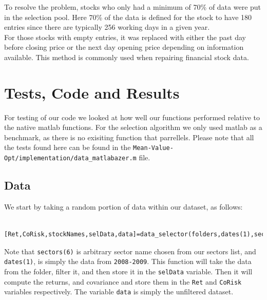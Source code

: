\documentclass[12pt,titlepage,a4paper]{article}
\begin{document}
To resolve the problem, stocks who only had a minimum of 70\% of data were put in the selection pool. Here 70\% of the data is defined for the stock to have 180 entries since there are typically 256 working days in a given year.\\

For those stocks with empty entries, it was replaced with either the past day before closing price or the next day opening price depending on information available. This method is commonly used when repairing financial stock data.  


\section{Tests, Code and Results}

\begin{par}
For testing of our code we looked at how well our functions performed relative to the native matlab functions. For the selection algorithm we only used matlab as a benchmark, as there is no exisiting function that parrellels. Please note that all the tests found here can be found in the \texttt{Mean-Value-Opt/implementation/data\_matlabazer.m} file.
\end{par} \vspace{1em}

\subsection*{Data}

\begin{par}
We start by taking a random portion of data within our dataset, as follows:
\end{par}
\begin{verbatim}
	[Ret,CoRisk,stockNames,selData,data]=data_selector(folders,dates(1),sectors(6));
\end{verbatim}
\begin{par}
Note that \texttt{sectors(6)} is arbitrary sector name chosen from our sectors list, and \texttt{dates(1)}, is simply the data from \texttt{2008-2009}. This function will take the data from the folder, filter it, and then store it in the \texttt{selData} variable. Then it will compute the returns, and covariance and store them in the \texttt{Ret} and \texttt{CoRisk} variables respectively. The variable \texttt{data} is simply the unfiltered dataset.
\end{par} \vspace{1em}
\end{document}
